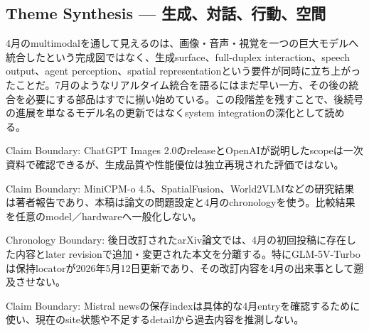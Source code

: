 \subsection{Theme Synthesis — 生成、対話、行動、空間}

4月のmultimodalを通して見えるのは、画像・音声・視覚を一つの巨大モデルへ統合したという完成図ではなく、生成surface、full-duplex interaction、speech output、agent perception、spatial representationという要件が同時に立ち上がったことだ。7月のようなリアルタイム統合を語るにはまだ早い一方、その後の統合を必要にする部品はすでに揃い始めている。この段階差を残すことで、後続号の進展を単なるモデル名の更新ではなくsystem integrationの深化として読める。\autocite{src-0f697d747d9c,src-3fa7f7c1140f,src-d113b486a585,src-d33ba68aac3c,src-d8b7c1c36830,src-fec81b98fdc8}


\begin{claimboundary}
Claim Boundary: ChatGPT Images 2.0のreleaseとOpenAIが説明したscopeは一次資料で確認できるが、生成品質や性能優位は独立再現された評価ではない。\autocite{src-0f697d747d9c}
\end{claimboundary}

\begin{claimboundary}
Claim Boundary: MiniCPM-o 4.5、SpatialFusion、World2VLMなどの研究結果は著者報告であり、本稿は論文の問題設定と4月のchronologyを使う。比較結果を任意のmodel／hardwareへ一般化しない。\autocite{src-3fa7f7c1140f,src-d33ba68aac3c,src-fec81b98fdc8}
\end{claimboundary}

\begin{claimboundary}
Chronology Boundary: 後日改訂されたarXiv論文では、4月の初回投稿に存在した内容とlater revisionで追加・変更された本文を分離する。特にGLM-5V-Turboは保持locatorが2026年5月12日更新であり、その改訂内容を4月の出来事として遡及させない。\autocite{src-d113b486a585}
\end{claimboundary}

\begin{claimboundary}
Claim Boundary: Mistral newsの保存indexは具体的な4月entryを確認するために使い、現在のsite状態や不足するdetailから過去内容を推測しない。\autocite{src-d8b7c1c36830}
\end{claimboundary}
